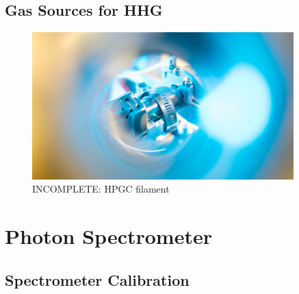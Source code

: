 \subsection{Gas Sources for HHG}
\label{sec:gas_source}
\begin{figure}
	\centering
	\includegraphics[width=0.9\textwidth]{figures/Beamline/high_pressure_cell_filament.jpg}
	\caption{INCOMPLETE: HPGC filament}
	\label{fig:HPGC_filament}
\end{figure}

\section{Photon Spectrometer}
\label{sec:photon_spec}


\subsection{Spectrometer Calibration}
\label{subsec:spec_calibration}